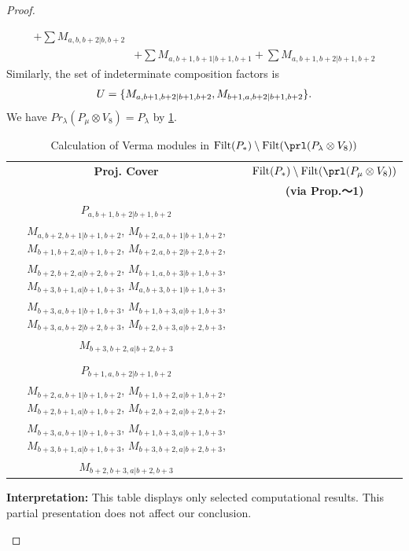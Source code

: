 \begin{proof}
\begin{enumerate}
\begin{enumerate}
\begin{equation}
\begin{aligned}
+ \sum M_{a,b,b+2|b,b+2}\\
                                            &
+ \sum M_{a,b+1,b+1|b+1,b+1}
+ \sum M_{a,b+1,b+2|b+1,b+2}
          \end{aligned}
        \end{equation}
      Similarly, the set of indeterminate composition factors is 
\begin{equation}\notag
  \begin{aligned}
    U = \{
M_{a,b+1,b+2|b+1,b+2},
M_{b+1,a,b+2|b+1,b+2}
\}.
  \end{aligned}
\end{equation}
       We have $Pr_{\lambda}(P_\mu \otimes V_{8}) = P_\lambda  $ by \cref{tab:verma-analysis_26}.
\begin{table}[htbp]
\centering
\caption{Calculation of Verma modules in $\operatorname{Filt}(P_*) \setminus \operatorname{Filt}(\prl(P_\lambda \otimes V_{8})) $ } \label{tab:verma-analysis_26}
\begin{tabular}{cc}
\toprule
\textbf{Proj. Cover} & \textbf{$\operatorname{Filt}(P_*) \setminus \operatorname{Filt}(\prl(P_\mu \otimes V_{8})) $}  \\
     & \textbf{(via Prop.～1)}  \\
\midrule
 $P_{a,b+1,b+2|b+1,b+2}$ & \makecell{
 $M_{a,b+2,b+2|b+2,b+2}$,
 $M_{a,b+1,b+3|b+1,b+3}$,
 $M_{a,b+3,b+2|b+2,b+3}$,
 $M_{b+2,b+1,a|b+1,b+2}$, \\
 $M_{a,b+2,b+1|b+1,b+2}$,
 $M_{b+2,a,b+1|b+1,b+2}$,
 $M_{b+1,b+2,a|b+1,b+2}$,
 $M_{b+2,a,b+2|b+2,b+2}$, \\
 $M_{b+2,b+2,a|b+2,b+2}$,
 $M_{b+1,a,b+3|b+1,b+3}$,
 $M_{b+3,b+1,a|b+1,b+3}$,
 $M_{a,b+3,b+1|b+1,b+3}$, \\
 $M_{b+3,a,b+1|b+1,b+3}$,
 $M_{b+1,b+3,a|b+1,b+3}$,
 $M_{b+3,a,b+2|b+2,b+3}$,
 $M_{b+2,b+3,a|b+2,b+3}$, \\
 $M_{b+3,b+2,a|b+2,b+3}$
}\\
 & \\
 $P_{b+1,a,b+2|b+1,b+2}$ & \makecell{
 $M_{b+2,a,b+2|b+2,b+2}$,
 $M_{b+1,a,b+3|b+1,b+3}$,
 $M_{b+3,a,b+2|b+2,b+3}$,
 $M_{b+2,a,b+3|b+2,b+3}$, \\
 $M_{b+2,a,b+1|b+1,b+2}$,
 $M_{b+1,b+2,a|b+1,b+2}$,
 $M_{b+2,b+1,a|b+1,b+2}$,
 $M_{b+2,b+2,a|b+2,b+2}$, \\
 $M_{b+3,a,b+1|b+1,b+3}$,
 $M_{b+1,b+3,a|b+1,b+3}$,
 $M_{b+3,b+1,a|b+1,b+3}$,
 $M_{b+3,b+2,a|b+2,b+3}$, \\
 $M_{b+2,b+3,a|b+2,b+3}$
}\\
\bottomrule
\end{tabular}
\vspace{0.5em}
\parbox{\linewidth}{\small
\textbf{Interpretation:}
This table displays only selected computational results. This partial presentation does not affect our conclusion.
}
\end{table}
    \end{enumerate}


\end{enumerate}
\end{proof}
